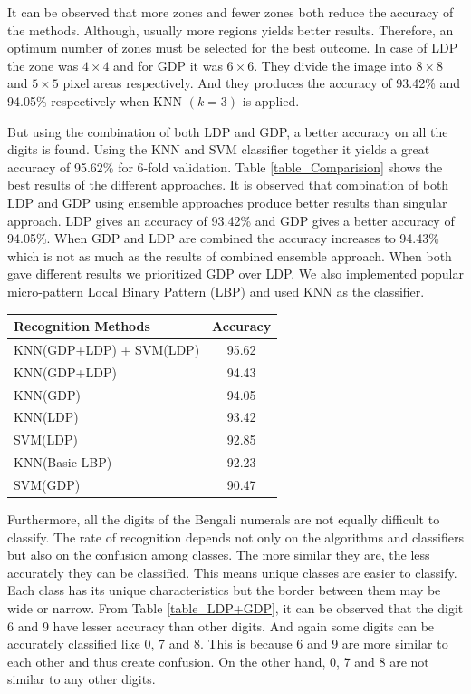 \documentclass[conference]{IEEEtran}
\begin{document}
It can be observed that more zones and fewer zones both reduce the accuracy of the methods. Although, usually more regions yields better results. Therefore, an optimum number of zones must be selected for the best outcome. In case of LDP the zone was $4 \times 4$ and for GDP it was $6 \times 6$. They divide the image into $8 \times 8$ and $5 \times 5$ pixel areas respectively. And they produces the accuracy of 93.42\% and 94.05\% respectively when KNN $(k = 3)$ is applied.

But using the combination of both LDP and GDP, a better accuracy on all the digits is found. Using the KNN and SVM classifier together it yields a great accuracy of 95.62\% for 6-fold validation. Table \ref{table_Comparision} shows the best results of the different approaches. It is observed that combination of both LDP and GDP using ensemble approaches produce better results than singular approach. LDP gives an accuracy of 93.42\% and GDP gives a better accuracy of 94.05\%. When GDP and LDP are combined the accuracy increases to 94.43\% which is not as much as the results of combined ensemble approach. When both gave different results we prioritized GDP over LDP. We also implemented popular micro-pattern Local Binary Pattern (LBP)\cite{2002LBP,2015LBP} and used KNN as the classifier.

\begin{center}
	\label{table_Comparision}
	\begin{tabular}{lc}
		\hline
		Recognition Methods & Accuracy \\
		\hline
		KNN(GDP+LDP) + SVM(LDP) & 95.62\\
		KNN(GDP+LDP) & 94.43\\
		KNN(GDP) & 94.05 \\
		KNN(LDP) & 93.42 \\
		SVM(LDP) & 92.85 \\
		KNN(Basic LBP) & 92.23\\
		SVM(GDP) & 90.47 \\
		\hline
	\end{tabular}
\end{center}

Furthermore, all the digits of the Bengali numerals are not equally difficult to classify. The rate of recognition depends not only on the algorithms and classifiers but also on the confusion among classes. The more similar they are, the less accurately they can be classified. This means unique classes are easier to classify. Each class has its unique characteristics but the border between them may be wide or narrow. From Table \ref{table_LDP+GDP}, it can be observed that the digit 6 and 9 have lesser accuracy than other digits. And again some digits can be accurately classified like 0, 7 and 8. This is because 6 and 9 are more similar to each other and thus create confusion. On the other hand, 0, 7 and 8 are not similar to any other digits.
\end{document}
